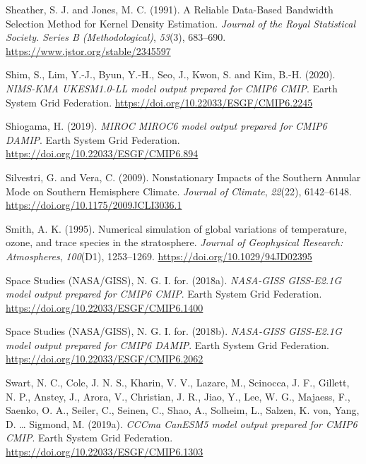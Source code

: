 \documentclass[12pt,oneside,a4paper]{reedthesis}
\newlength{\cslhangindent}
\newenvironment{CSLReferences}[2] %
 {%
  \setlength{\parindent}{0pt}
  \ifodd #1 \everypar{\setlength{\hangindent}{\cslhangindent}}\ignorespaces\fi
  \ifnum #2 > 0
  \setlength{\parskip}{#2\baselineskip}
  \fi
 }%
 {}
\begin{document}
\begin{CSLReferences}{1}{0}
\leavevmode{}%
Sheather, S. J. and Jones, M. C. (1991). A {Reliable Data-Based Bandwidth Selection Method} for {Kernel Density Estimation}. \emph{Journal of the Royal Statistical Society. Series B (Methodological)}, \emph{53}(3), 683--690. \url{https://www.jstor.org/stable/2345597}

\leavevmode{}%
Shim, S., Lim, Y.-J., Byun, Y.-H., Seo, J., Kwon, S. and Kim, B.-H. (2020). \emph{NIMS-KMA UKESM1.0-LL model output prepared for CMIP6 CMIP}. Earth System Grid Federation. \url{https://doi.org/10.22033/ESGF/CMIP6.2245}

\leavevmode{}%
Shiogama, H. (2019). \emph{MIROC MIROC6 model output prepared for CMIP6 DAMIP}. Earth System Grid Federation. \url{https://doi.org/10.22033/ESGF/CMIP6.894}

\leavevmode{}%
Silvestri, G. and Vera, C. (2009). Nonstationary {Impacts} of the {Southern Annular Mode} on {Southern Hemisphere Climate}. \emph{Journal of Climate}, \emph{22}(22), 6142--6148. \url{https://doi.org/10.1175/2009JCLI3036.1}

\leavevmode{}%
Smith, A. K. (1995). Numerical simulation of global variations of temperature, ozone, and trace species in the stratosphere. \emph{Journal of Geophysical Research: Atmospheres}, \emph{100}(D1), 1253--1269. \url{https://doi.org/10.1029/94JD02395}

\leavevmode{}%
Space Studies (NASA/GISS), N. G. I. for. (2018a). \emph{NASA-GISS GISS-E2.1G model output prepared for CMIP6 CMIP}. Earth System Grid Federation. \url{https://doi.org/10.22033/ESGF/CMIP6.1400}

\leavevmode{}%
Space Studies (NASA/GISS), N. G. I. for. (2018b). \emph{NASA-GISS GISS-E2.1G model output prepared for CMIP6 DAMIP}. Earth System Grid Federation. \url{https://doi.org/10.22033/ESGF/CMIP6.2062}

\leavevmode{}%
Swart, N. C., Cole, J. N. S., Kharin, V. V., Lazare, M., Scinocca, J. F., Gillett, N. P., Anstey, J., Arora, V., Christian, J. R., Jiao, Y., Lee, W. G., Majaess, F., Saenko, O. A., Seiler, C., Seinen, C., Shao, A., Solheim, L., Salzen, K. von, Yang, D. \ldots{} Sigmond, M. (2019a). \emph{CCCma CanESM5 model output prepared for CMIP6 CMIP}. Earth System Grid Federation. \url{https://doi.org/10.22033/ESGF/CMIP6.1303}


\end{CSLReferences}
\end{document}
